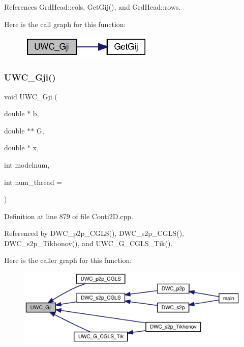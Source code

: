 References Grd\+Head\+::cols, Get\+Gij(), and Grd\+Head\+::rows.

Here is the call graph for this function\+:
\nopagebreak
\begin{figure}[H]
\begin{center}
\leavevmode
\includegraphics[width=182pt]{Conti2D_8h_a8605c53ff46885c04166a7f598084aa4_a8605c53ff46885c04166a7f598084aa4_cgraph}
\end{center}
\end{figure}
\mbox{\label{Conti2D_8h_a5a86fe867d4a2fdba586856b2b91de27_a5a86fe867d4a2fdba586856b2b91de27}} 
\subsubsection{U\+W\+C\+\_\+\+Gji()\hspace{0.1cm}{\footnotesize\ttfamily [2/2]}}
{\footnotesize\ttfamily void U\+W\+C\+\_\+\+Gji (\begin{DoxyParamCaption}\item[{double $\ast$}]{b,  }\item[{double $\ast$$\ast$}]{G,  }\item[{double $\ast$}]{x,  }\item[{int}]{modelnum,  }\item[{int}]{num\+\_\+thread = {} }\end{DoxyParamCaption})}



Definition at line 879 of file Conti2\+D.\+cpp.



Referenced by D\+W\+C\+\_\+p2p\+\_\+\+C\+G\+L\+S(), D\+W\+C\+\_\+s2p\+\_\+\+C\+G\+L\+S(), D\+W\+C\+\_\+s2p\+\_\+\+Tikhonov(), and U\+W\+C\+\_\+\+G\+\_\+\+C\+G\+L\+S\+\_\+\+Tik().

Here is the caller graph for this function\+:\nopagebreak
\begin{figure}[H]
\begin{center}
\leavevmode
\includegraphics[width=350pt]{Conti2D_8h_a5a86fe867d4a2fdba586856b2b91de27_a5a86fe867d4a2fdba586856b2b91de27_icgraph}
\end{center}
\end{figure}
\mbox{\label{Conti2D_8h_a7b6bfe9f5b32bc1a62005196d84edfde_a7b6bfe9f5b32bc1a62005196d84edfde}} 
